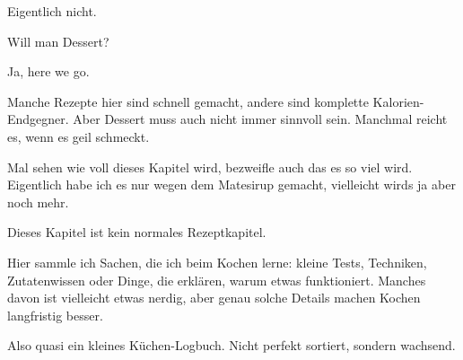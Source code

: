 \documentclass[
  a4paper,
  twoside,
  11pt
]{article}
\begin{document}
Eigentlich nicht.

Will man Dessert?

Ja, here we go.

Manche Rezepte hier sind schnell gemacht, andere sind komplette Kalorien-Endgegner. Aber Dessert muss auch nicht immer sinnvoll sein. Manchmal reicht es, wenn es geil schmeckt.

\mylocaltableofcontents%
\newpage
















Mal sehen wie voll dieses Kapitel wird, bezweifle auch das es so viel wird. Eigentlich habe ich es nur wegen dem Matesirup gemacht, vielleicht wirds ja aber noch mehr.

\mylocaltableofcontents%
\newpage








Dieses Kapitel ist kein normales Rezeptkapitel.

Hier sammle ich Sachen, die ich beim Kochen lerne: kleine Tests, Techniken, Zutatenwissen oder Dinge, die erklären, warum etwas funktioniert. Manches davon ist vielleicht etwas nerdig, aber genau solche Details machen Kochen langfristig besser.

Also quasi ein kleines Küchen-Logbuch. Nicht perfekt sortiert, sondern wachsend.

\mylocaltableofcontents%
\newpage


\end{document}
